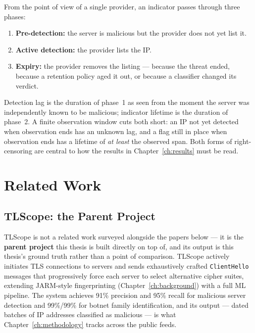 From the point of view of a single provider, an indicator passes through three phases:
\begin{enumerate}
  \item \textbf{Pre-detection:} the server is malicious but the provider does not yet list it.
  \item \textbf{Active detection:} the provider lists the IP.
  \item \textbf{Expiry:} the provider removes the listing --- because the threat ended, because a
    retention policy aged it out, or because a classifier changed its verdict.
\end{enumerate}
Detection lag is the duration of phase~1 as seen from the moment the server was independently
known to be malicious; indicator lifetime is the duration of phase~2. A finite observation window
cuts both short: an IP not yet detected when observation ends has an unknown lag, and a flag still
in place when observation ends has a lifetime of \emph{at least} the observed span. Both forms of
right-censoring are central to how the results in Chapter~\ref{ch:results} must be read.

\chapter{Related Work}
\label{ch:related_work}

\section{TLScope: the Parent Project}

TLScope \cite{theofanous2024tlscope} is not a related work surveyed alongside the papers below ---
it is the \textbf{parent project} this thesis is built directly on top of, and its output is this
thesis's ground truth rather than a point of comparison. TLScope actively initiates TLS connections
to servers and sends exhaustively crafted \texttt{ClientHello} messages that progressively force
each server to select alternative cipher suites, extending JARM-style fingerprinting
(Chapter~\ref{ch:background}) with a full ML pipeline. The system achieves 91\% precision and 95\%
recall for malicious server detection and 99\%/99\% for botnet family identification, and its
output --- dated batches of IP addresses classified as malicious --- is what
Chapter~\ref{ch:methodology} tracks across the public feeds.

